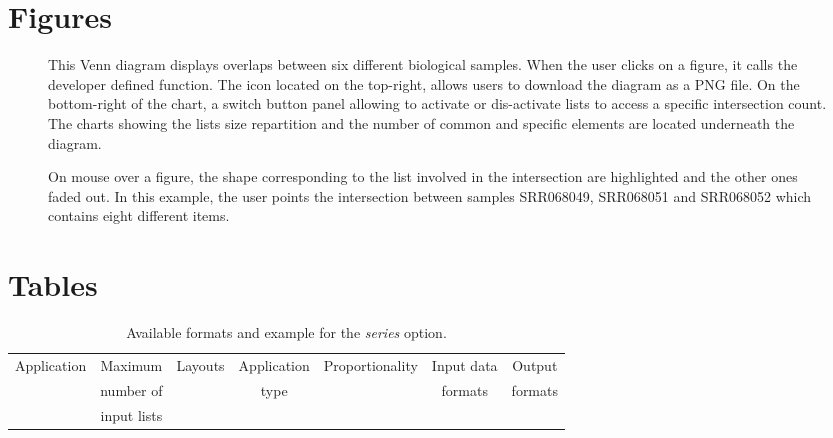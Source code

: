 \documentclass{bmcart}
\begin{document}
\begin{backmatter}


\section*{Figures}
  \begin{figure}[h!]
  \caption{
      This Venn diagram displays overlaps between six different biological
      samples. When the user clicks on a figure, it calls the developer defined
      function. The icon located on the top-right, allows users to download the
      diagram as a PNG file. On the bottom-right of the chart, a switch button
      panel allowing to activate or dis-activate lists to access a specific
      intersection count. The charts showing the lists size repartition and the
      number of common and specific elements are located underneath the
      diagram.}
      \end{figure}

\begin{figure}[h!]
  \caption{
      On mouse over a figure, the shape corresponding to the list involved in
      the intersection are highlighted and the other ones faded out. In
      this example, the user points the intersection between samples SRR068049,
      SRR068051 and SRR068052 which contains eight different items.}
      \end{figure}


\section*{Tables}

\begin{table}[h!]
\caption{Available formats and example for the \textit{series} option.}
	\begin{tabular}{c|cccccc}
		Application & Maximum & Layouts & Application &
		Proportionality & Input data & Output\\ 
		& number of & & type & & formats & formats \\
		& input lists & & & & & \\ \hline
		

\end{tabular}
\end{table}
\end{backmatter}
\end{document}

